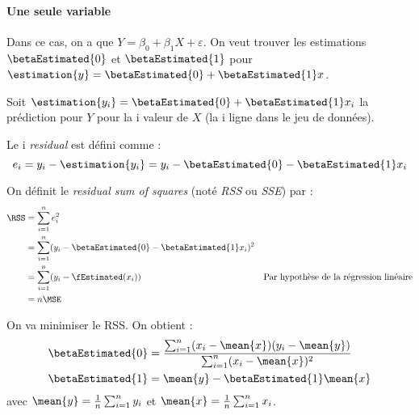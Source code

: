         \paragraph{Une seule variable} Dans ce cas, on a que \(Y = \beta_0 + \beta_1 X + \varepsilon\). On veut trouver les estimations \(\betaEstimated{0}\) et \(\betaEstimated{1}\) pour \(\estimation{y} = \betaEstimated{0} + \betaEstimated{1} x\).

        \begin{definition}
            Soit \(\estimation{y_i} = \betaEstimated{0} + \betaEstimated{1}x_i\) la prédiction pour \(Y\) pour la i\ieme{} valeur de \(X\) (la i\ieme{} ligne dans le jeu de données).

            Le i\ieme{} \textit{residual} est défini comme :
            \[
                e_i = y_i - \estimation{y_i} = y_i - \betaEstimated{0} - \betaEstimated{1} x_i
            \]

            On définit le \textit{residual sum of squares} (noté \textit{RSS} ou \textit{SSE}) par :
            \begin{align*}
                \RSS &= \sum_{i=1}^n e_i^2\\
                &= \sum_{i=1}^n (y_i - \betaEstimated{0} - \betaEstimated{1} x_i)^2\\
                &= \sum_{i=1}^n (y_i - \fEstimated(x_i)) & \text{Par hypothèse de la régression linéaire}\\
                &= n \MSE\index{MSE}
            \end{align*}
        \end{definition}

        On va minimiser le RSS. On obtient :
        \begin{align*}
            \betaEstimated{0} &= \frac{\sum_{i=1}^n (x_i - \mean{x})(y_i - \mean{y})}{\sum_{i=1}^n (x_i - \mean{x})^2}\\
            \betaEstimated{1} &= \mean{y} - \betaEstimated{1}\mean{x}
        \end{align*}
        avec \(\mean{y} = \frac{1}{n}\sum_{i=1}^n y_i\) et \(\mean{x} = \frac{1}{n}\sum_{i=1}^n x_i\).

